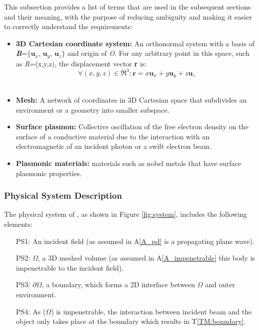 \documentclass[12pt]{article}
\begin{document}
	
	This subsection provides a list of terms that are used in the subsequent
	sections and their meaning, with the purpose of reducing ambiguity and making it
	easier to correctly understand the requirements:
	
	\begin{itemize} \item \textbf{3D Cartesian coordinate system:} An orthonormal
		system with a basis of \textbf{\textit{B}}=$\{$$\textbf{u}_x$, $\textbf{u}_y$,
		$\textbf{u}_z$$\}$ and origin of \textit{O}. For any arbitrary point in this
		space, such as \textit{R}=(x,y,z), the displacement vector \textbf{r} is: \\
		
		\begin{equation} \label{eq:planewave} \forall (x, y, z) \in \Re^3:
			\textbf{r}= x\textbf{u}_x + y\textbf{u}_y +z\textbf{u}_z \end{equation} \\
		
		\item \textbf{Mesh:} A network of coordinates in 3D Cartesian space that
		subdivides an environment or a geometry into smaller subspace. \item
		\textbf{Surface plasmon:} Collective oscillation of the free electron density on
		the surface of a conductive material due to the interaction with an
		electromagnetic of an incident photon or a swift electron beam. \item
		\textbf{Plasmonic materials:} materials such as nobel metals that have surface
		plasmonic properties.
		
		
	\end{itemize}
	
	
	\subsubsection{Physical System Description} \label{sec_phySystDescrip}

	
	
	The physical system of \progname{}, as shown in Figure \ref{fig:system},
	includes the following elements:
	
	
	\begin{itemize}
		
		\item[PS1:] An incident field (as assumed in A\ref{A_pd} is a propagating plane
		wave).
		
		\item[PS2:] $\Omega$, a 3D meshed volume (as assumed in A\ref{A_impenetrable}
		this body is impenetrable to the incident field).
		
		\item[PS3:] $\partial\Omega$, a boundary, which forms a 2D interface between
		$\Omega$ and outer environment.
		
		
		\item[PS4:] As ($\Omega$) is impenetrable, the interaction between incident beam
		and the object only takes place at the boundary which results in
		T\ref{TM:boundary}. 
	\end{itemize}
	
\end{document}
